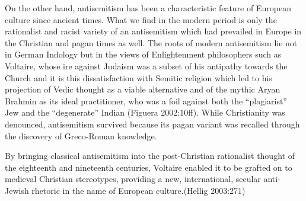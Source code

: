 On the other hand, antisemitism has been a characteristic feature of European culture since ancient times. What we find in the modern period is only the rationalist and racist variety of an antisemitism which had prevailed in Europe in the Christian and pagan times as well. The roots of modern antisemitism lie not in German Indology but in the views of Enlightenment philosophers such as Voltaire, whose ire against Judaism was a subset of his antipathy towards the Church and it is this dissatisfaction with Semitic religion which led to his projection of Vedic thought as a viable alternative and of the mythic Aryan Brahmin as its ideal practitioner, who was a foil against both the “plagiarist” Jew and the “degenerate” Indian (Figuera 2002:10ff). While Christianity was denounced, antisemitism survived because its pagan variant was recalled through the discovery of Greco-Roman knowledge. 
\begin{myquote}
By bringing classical antisemitism into the post-Christian rationalist thought of the eighteenth and nineteenth centuries, Voltaire enabled it to be grafted on to medieval Christian stereotypes, providing a new, international, secular anti-Jewish rhetoric in the name of European culture.\hfill(Hellig 2003:271)
\end{myquote}
\medskip

